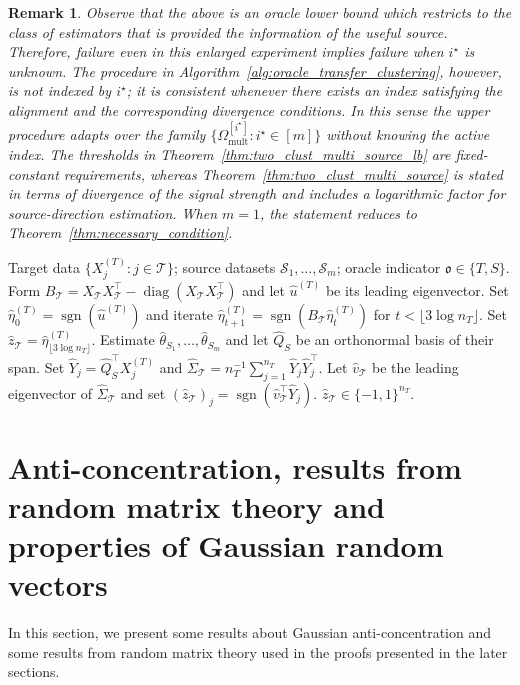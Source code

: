 \documentclass[10pt]{article}
\newtheorem{remark}{Remark}
\newcommand{\sgn}{\operatorname{sgn}}
\newcommand{\diag}{\operatorname{diag}}
\newcommand{\wh}{\widehat}
\newcommand{\calT}{\mathcal T}
\newcommand{\trg}{T}
\newcommand{\nT}{n_{\trg}}
\newcommand{\Xtar}{X^{(\trg)}}
\newcommand{\calS}{\mathcal S}
\newcommand{\src}{S}
\newcommand{\hatthetaSm}[1]{\wh{\theta}_{S_{#1}}}
\begin{document}
\begin{remark}
Observe that the above is an oracle lower bound which restricts to the class of estimators that is provided the information of the useful source. Therefore, failure even in this enlarged experiment implies failure when $i^\star$ is unknown.
The procedure in
Algorithm~\ref{alg:oracle_transfer_clustering}, however, is not indexed by
$i^\star$; it is consistent whenever there exists an index satisfying the
alignment and the corresponding divergence conditions.  In this sense the
upper procedure adapts over the family
$\{\Omega_{\mathrm{mult}}^{[i^\star]}:i^\star\in[m]\}$ without knowing the
active index.  The thresholds in Theorem~\ref{thm:two_clust_multi_source_lb} are fixed-constant requirements, whereas Theorem~\ref{thm:two_clust_multi_source} is stated in terms of divergence of the signal strength and includes a logarithmic factor for source-direction estimation. When $m=1$, the statement reduces to Theorem~\ref{thm:necessary_condition}.
\end{remark}

\begin{algorithm}[tb]
\caption{Oracle Transfer-Assisted Clustering}
\label{alg:oracle_transfer_clustering}
\begin{algorithmic}[1]
\Require Target data $\{\Xtar_j:j\in\calT\}$; source datasets
$\calS_1,\ldots,\calS_m$; oracle indicator $\mathfrak o\in\{\trg,\src\}$.
\If{$\mathfrak o=\trg$}
    \State Form $B_{\calT}=X_{\calT}X_{\calT}^\top-
    \diag(X_{\calT}X_{\calT}^\top)$ and let $\wh u^{(\trg)}$ be its leading eigenvector.
    \State Set $\wh\eta^{(\trg)}_0=\sgn(\wh u^{(\trg)})$ and iterate
    $\wh\eta^{(\trg)}_{t+1}=\sgn(B_{\calT}\wh\eta^{(\trg)}_t)$ for
    $t<\lfloor 3\log\nT\rfloor$.
    \State Set $\wh z_{\calT}=\wh\eta^{(\trg)}_{\lfloor 3\log\nT\rfloor}$.
\Else
    \State Estimate $\hatthetaSm{1},\ldots,\hatthetaSm{m}$ and let
    $\widehat Q_{\src}$ be an orthonormal basis of their span.
    \State Set $\widehat Y_j=\widehat Q_{\src}^\top\Xtar_j$ and
    $\widehat\Sigma_{\calT}=\nT^{-1}\sum_{j=1}^{\nT}\widehat Y_j\widehat Y_j^\top$.
    \State Let $\widehat v_{\calT}$ be the leading eigenvector of
    $\widehat\Sigma_{\calT}$ and set
    $(\wh z_{\calT})_j=\sgn(\widehat v_{\calT}^\top\widehat Y_j)$.
\EndIf
\Output $\wh z_{\calT}\in\{-1,1\}^{\nT}$.
\end{algorithmic}
\end{algorithm}


\section{Anti-concentration, results from random matrix theory and properties of Gaussian random vectors}
In this section, we present some results about Gaussian anti-concentration and some results from random matrix theory used in the proofs presented in the later sections.
\end{document}
